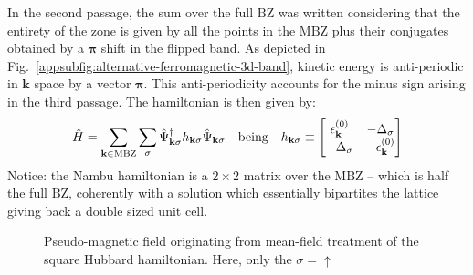 In the second passage, the sum over the full $\mathrm{BZ}$ was written considering that the entirety of the zone is given by all the points in the $\mathrm{MBZ}$ plus their conjugates obtained by a $\bm{\pi}$ shift in the flipped band. As depicted in Fig.~\ref{appsubfig:alternative-ferromagnetic-3d-band}, kinetic energy is anti-periodic in $\mathbf{k}$ space by a vector $\bm{\pi}$. This anti-periodicity accounts for the minus sign arising in the third passage. The hamiltonian is then given by:
\begin{equation}\label{appeq:hubbard-bogoliubov-hamiltonian}
	\hat H = \sum_{\mathbf{k} \in \mathrm{MBZ}} \sum_\sigma \hat \Psi_{\mathbf{k}\sigma}^\dagger h_{\mathbf{k}\sigma} \hat \Psi_{\mathbf{k}\sigma}
	\qq{being}
	h_{\mathbf{k}\sigma} \equiv \begin{bmatrix}
		\epsilon_\mathbf{k}^{(0)} & -\Delta_\sigma \\
		-\Delta_\sigma & - \epsilon_\mathbf{k}^{(0)}
	\end{bmatrix}
\end{equation}
Notice: the Nambu hamiltonian is a $2\times2$ matrix over the $\mathrm{MBZ}$ -- which is half the full $\mathrm{BZ}$, coherently with a solution which essentially bipartites the lattice giving back a double sized unit cell.

\begin{figure}
	\centering
%	
	\caption{Pseudo-magnetic field originating from mean-field treatment of the square Hubbard hamiltonian. Here, only the $\sigma=\uparrow$}
	\label{appfig:pseudo-magnetic-field}
\end{figure}

